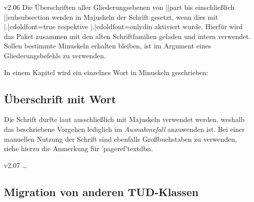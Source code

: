 \begin{Entity}{}
\begin{NoIndexDefault}
\begin{Cessations}{v2.06}
%
Die Überschriften aller Gliederungsebenen von \Macro||{part} bis einschließlich 
\Macro||{subsubsection} werden in Majuskeln der Schrift \DIN gesetzt, wenn dies 
mit \Option|.|{cdoldfont=true} respektive \Option|.|{cdoldfont=onlydin} 
aktiviert wurde. Hierfür wird das Paket  zusammen mit den 
alten Schriftfamilien geladen und intern  verwendet. 
Sollen bestimmte Minuskeln erhalten bleiben, ist  im 
Argument eines Gliederungsbefehls zu verwenden.
%
\begin{Example}
In einem Kapitel wird ein einzelnes Wort in Minuskeln geschrieben:
\begin{Code}[escapechar=§]
\chapter{Überschrift mit  Wort}
\end{Code}
\end{Example}
%
Die Schrift \DIN durfte laut \CD ausschließlich mit Majuskeln verwendet werden, 
weshalb das beschriebene Vorgehen lediglich im \emph{Ausnahmefall} anzuwenden 
ist. Bei einer manuellen Nutzung der Schrift sind ebenfalls Großbuchstaben zu 
verwenden, siehe hierzu die Anmerkung für \Macro'pageref'{textdbn}.
\end{Cessations}

\begin{Cessations}{v2.07}
\dots
{}%
\end{Cessations}
\end{NoIndexDefault}
\end{Entity}



\section[%
  Das Paket \Package{tudscrcomp} -- Migration von anderen TUD-Klassen%
]{%
  Migration von anderen TUD-Klassen%
}
%

